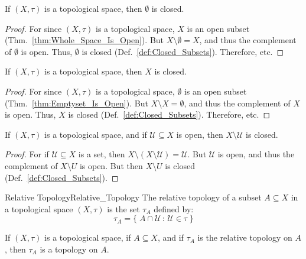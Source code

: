     \begin{theorem}
        \label{thm:Emptyset_Is_Closed}%
        If $(X,\tau)$ is a topological space, then $\emptyset$ is closed.
    \end{theorem}
    \begin{proof}
        For since $(X,\tau)$ is a topological space, $X$ is an open subset
        (Thm.~\ref{thm:Whole_Space_Is_Open}). But $X\setminus\emptyset=X$, and
        thus the complement of $\emptyset$ is open. Thus, $\emptyset$ is closed
        (Def.~\ref{def:Closed_Subsets}). Therefore, etc.
    \end{proof}
    \begin{theorem}
        \label{thm:Whole_Space_Is_Closed}%
        If $(X,\tau)$ is a topological space, then $X$ is closed.
    \end{theorem}
    \begin{proof}
        For since $(X,\tau)$ is a topological space, $\emptyset$ is an open
        subset (Thm.~\ref{thm:Emptyset_Is_Open}). But $X\setminus{X}=\emptyset$,
        and thus the complement of $X$ is open. Thus, $X$ is closed
        (Def.~\ref{def:Closed_Subsets}). Therefore, etc.
    \end{proof}
    \begin{theorem}
        \label{thm:Comp_of_Open_is_Closed}%
        If $(X,\tau)$ is a topological space, and if $\mathcal{U}\subseteq{X}$
        is open, then $X\setminus\mathcal{U}$ is closed.
    \end{theorem}
    \begin{proof}
        For if $\mathcal{U}\subseteq{X}$ is a set, then
        $X\setminus(X\setminus\mathcal{U})=\mathcal{U}$. But $\mathcal{U}$ is
        open, and thus the complement of $X\setminus{U}$ is open. But then
        $X\setminus{U}$ is closed (Def.~\ref{def:Closed_Subsets}).
    \end{proof}
    \begin{ldefinition}{Relative Topology}{Relative_Topology}
        The relative topology of a subset $A\subseteq{X}$ in a topological space
        $(X,\tau)$ is the set $\tau_{A}$ defined by:
        \begin{equation}
            \tau_{A}=\big\{\;A\cap\mathcal{U}\,:\,\mathcal{U}\in\tau\;\big\}
        \end{equation}
    \end{ldefinition}
    \begin{theorem}
        If $(X,\tau)$ is a topological space, if $A\subseteq{X}$, and if
        $\tau_{A}$ is the relative topology on $A$, then $\tau_{A}$ is a
        topology on $A$.
    \end{theorem}
